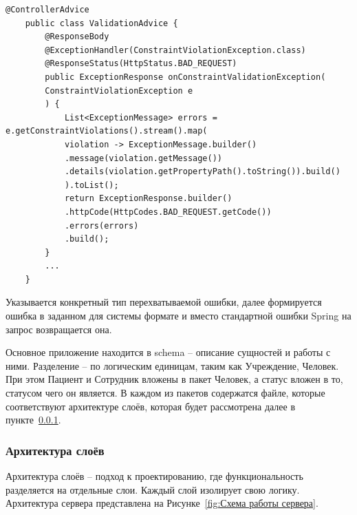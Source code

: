 \documentclass[a4paper,article]{article}
\begin{document}
    \begin{lstlisting}[label=validationadvice,caption=Класс-прехватчик ошибок Spring]
    @ControllerAdvice
    public class ValidationAdvice {
        @ResponseBody
        @ExceptionHandler(ConstraintViolationException.class)
        @ResponseStatus(HttpStatus.BAD_REQUEST)
        public ExceptionResponse onConstraintValidationException(
        ConstraintViolationException e
        ) {
            List<ExceptionMessage> errors = e.getConstraintViolations().stream().map(
            violation -> ExceptionMessage.builder()
            .message(violation.getMessage())
            .details(violation.getPropertyPath().toString()).build()
            ).toList();
            return ExceptionResponse.builder()
            .httpCode(HttpCodes.BAD_REQUEST.getCode())
            .errors(errors)
            .build();
        }
        ...
    }
    \end{lstlisting}
    
    Указывается конкретный тип перехватываемой ошибки, далее формируется ошибка в заданном для системы формате и вместо стандартной ошибки Spring на запрос возвращается она.
    
    Основное приложение находится в schema -- описание сущностей и работы с ними. Разделение -- по логическим единицам, таким как Учреждение, Человек. При этом Пациент и Сотрудник вложены в пакет Человек, а статус вложен в то, статусом чего он является. В каждом из пакетов содержатся файле, которые соответствуют архитектуре слоёв, которая будет рассмотрена далее в пункте~\ref{Реализация. Сервер. Архитектура слоёв}.

    \subsubsection{Архитектура слоёв}\label{Реализация. Сервер. Архитектура слоёв}
    
    Архитектура слоёв -- подход к проектированию, где функциональность разделяется на отдельные слои. Каждый слой изолирует свою логику. Архитектура сервера представлена на Рисунке~\ref{fig:Схема работы сервера}.
    
\end{document}
